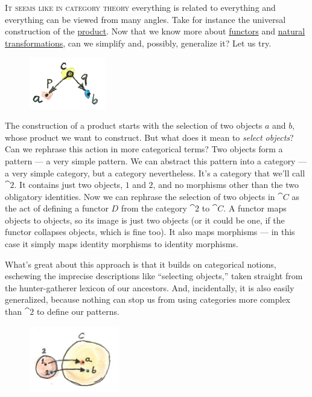 
\lettrine[lhang=0.17]{I}{t seems like in category theory} everything is related to everything and
everything can be viewed from many angles. Take for instance the
universal construction of the \hyperref[products-and-coproducts]{product}.
Now that we know more about \hyperref[functors]{functors} and
\hyperref[natural-transformations]{natural transformations}, can we simplify and, possibly, generalize it? Let us
try.

\begin{figure}[H]
  \centering
  \includegraphics[width=0.3\textwidth]{images/productpattern.jpg}
\end{figure}

\noindent
The construction of a product starts with the selection of two objects
$a$ and $b$, whose product we want to construct. But what
does it mean to \emph{select objects}? Can we rephrase this action in
more categorical terms? Two objects form a pattern --- a very simple
pattern. We can abstract this pattern into a category --- a very simple
category, but a category nevertheless. It's a category that we'll call
$\cat{2}$. It contains just two objects, $1$ and $2$, and no morphisms
other than the two obligatory identities. Now we can rephrase the
selection of two objects in $\cat{C}$ as the act of defining a functor $D$
from the category $\cat{2}$ to $\cat{C}$. A functor maps objects to
objects, so its image is just two objects (or it could be one, if the
functor collapses objects, which is fine too). It also maps morphisms
--- in this case it simply maps identity morphisms to identity
morphisms.

What's great about this approach is that it builds on categorical
notions, eschewing the imprecise descriptions like ``selecting
objects,'' taken straight from the hunter-gatherer lexicon of our
ancestors. And, incidentally, it is also easily generalized, because
nothing can stop us from using categories more complex than $\cat{2}$
to define our patterns.

\begin{figure}[H]
  \centering
  \includegraphics[width=0.35\textwidth]{images/two.jpg}
\end{figure}

